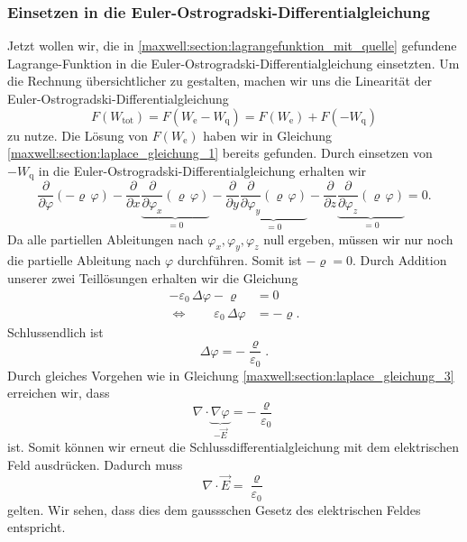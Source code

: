 \subsubsection{Einsetzen in die Euler-Ostrogradski-Differentialgleichung}
Jetzt wollen wir, die in \eqref{maxwell:section:lagrangefunktion_mit_quelle} gefundene Lagrange-Funktion in die Euler-Ostrogradski-Differentialgleichung einsetzten.
Um die Rechnung übersichtlicher zu gestalten, machen wir uns die Linearität der Euler-Ostrogradski-Differentialgleichung
\begin{equation}
F(W_{\text{tot}})
=
F(W_{\text{e}} - W_{\text{q}})
=
F(W_{\text{e}}) + F(-W_{\text{q}})
\label{maxwell:section:linearität_von_DGL}
\end{equation}
zu nutze.
Die Lösung von $F(W_{\text{e}})$ haben wir in Gleichung \eqref{maxwell:section:laplace_gleichung_1} bereits gefunden.
Durch einsetzen von $-W_{\text{q}}$ in die Euler-Ostrogradski-Differentialgleichung erhalten wir
\[
\frac{\partial}{\partial\varphi}\left(-\varrho\,\varphi\right) - \frac{\partial}{\partial x} \underbrace{\frac{\partial}{\partial\varphi_x}\left(\varrho\,\varphi\right)}_{\displaystyle=0} - \frac{\partial}{\partial y} \underbrace{\frac{\partial}{\partial\varphi_y}\left(\varrho\,\varphi\right)}_{\displaystyle=0} - \frac{\partial}{\partial z} \underbrace{\frac{\partial}{\partial\varphi_z}\left(\varrho\,\varphi\right)}_{\displaystyle=0}
=
0.
\]
Da alle partiellen Ableitungen nach $\varphi_x, \varphi_y, \varphi_z$ null ergeben, müssen wir nur noch die partielle Ableitung nach $\varphi$ durchführen.
Somit ist
\(
-\varrho
=
0.
\)
Durch Addition unserer zwei Teillösungen erhalten wir die Gleichung
\begin{align*}
-\varepsilon_0\,\Delta\varphi - \varrho
&=
0
\\
\Leftrightarrow \qquad \varepsilon_0\,\Delta\varphi
&=
-\varrho.
\end{align*}
Schlussendlich ist
\begin{equation}
\Delta\varphi
=
-\frac{\varrho}{\varepsilon_0}.
\label{maxwell:section:erste_maxwellgleichung_1}
\end{equation}
Durch gleiches Vorgehen wie in Gleichung \eqref{maxwell:section:laplace_gleichung_3} erreichen wir, dass
\[
\nabla\cdot\underbrace{\nabla\varphi}_{\displaystyle-\vec{E}}
=
-\frac{\varrho}{\varepsilon_0}
\]
ist.
Somit können wir erneut die Schlussdifferentialgleichung mit dem elektrischen Feld ausdrücken.
Dadurch muss
\begin{equation}
\nabla\cdot\vec{E}
=
\frac{\varrho}{\varepsilon_0}
\label{maxwell:section:erste_maxwellgleichung_2}
\end{equation}
gelten.
Wir sehen, dass dies dem gaussschen Gesetz des elektrischen Feldes entspricht.
%

